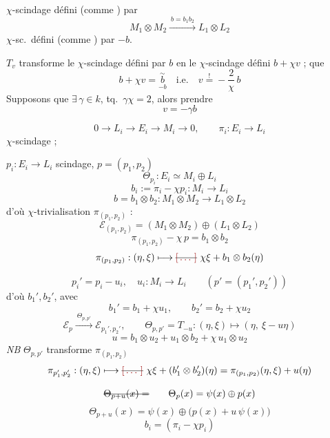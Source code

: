 \documentclass[11pt,a4paper]{article}
\begin{document}
$\chi$-scindage défini (comme ) par
\[
  M_1 \otimes M_2 \xrightarrow{\ b = b_1 b_2\ } L_1 \otimes L_2
\]
$\chi$-sc.\ défini (comme \ill{}) par $-b$.

$T_v$ \struck{\ill{}}transforme le $\chi$-scindage défini par $b$ en le $\chi$-scindage défini  $b + \chi v$ ; \ill{} \ill{} \ill{} que
\[
  b + \chi v = \underset{\displaystyle -b}{\overset{\sim}{b}}
  \quad\text{i.e.}\quad v \overset{!}{=} -\frac{2}{\chi}\, b
\]
Supposons que $\exists\, \gamma \in k$, tq.\ $\gamma\chi = 2$, alors prendre
\[
  \boxed{v = -\gamma b}
\]

\[
  0 \to L_i \to E_i \to M_i \to 0, \qquad \pi_i : E_i \to L_i
\]
$\chi$-scindage ; \ill{}

$p_i : E_i \to L_i$ scindage, \quad $p = (p_1, p_2)$
\[
  \Theta_{p_i} : E_i \simeq M_i \oplus L_i
\]
\[
  b_i := \pi_i - \chi p_i : M_i \to L_i
\]
\[
  b = b_1 \otimes b_2 : M_1 \otimes M_2 \to L_1 \otimes L_2
\]
d'où $\chi$-trivialisation \ill{} \ill{} $\pi_{(p_1,p_2)}$ :
\[
  \mathcal{E}_{(p_1,p_2)} = (M_1 \otimes M_2) \oplus (L_1 \otimes L_2)
\]
\[
  \pi_{(p_1,p_2)} - \chi\, p = b_1 \otimes b_2
\]
\[
  \pi_{(p_1,p_2)} : (\eta,\xi) \longmapsto \text{\struck{\ill{}}}\ \chi\xi + b_1 \otimes b_2(\eta)
\]

\[
  p_i' = p_i - u_i, \quad u_i : M_i \to L_i \qquad (p' = (p_1', p_2'))
\]
d'où $b_1', b_2'$, avec
\[
  b_1' = b_1 + \chi u_1, \qquad b_2' = b_2 + \chi u_2
\]
\[
  \mathcal{E}_{p} \xrightarrow{\ \Theta_{p,p'}\ } \mathcal{E}_{p_1',p_2'},
  \qquad \Theta_{p,p'} = T_{-u} :
  (\eta,\xi) \longmapsto (\eta,\ \xi - u\eta)
\]
\[
  u = b_1 \otimes u_2 + u_1 \otimes b_2 + \chi\, u_1 \otimes u_2
\]
\emph{NB} $\Theta_{p,p'}$ transforme $\pi_{(p_1,p_2)}$
\[
  \pi_{p_1',p_2'} : (\eta,\xi) \longmapsto \text{\struck{\ill{}}}\ \chi\xi + (b_1' \otimes b_2')(\eta)
  = \pi_{(p_1,p_2)}(\eta,\xi) + u(\eta)
\]

\[
  \text{\struck{$\Theta_{p+u}(x) =$}}
  \qquad
  \Theta_p(x) = \psi(x) \oplus p(x)
\]
\[
  \Theta_{p+u}(x) = \psi(x) \oplus \bigl(p(x) + u\,\psi(x)\bigr)
\]
\[
  \boxed{b_i = (\pi_i - \chi p_i)}
\]
\end{document}
